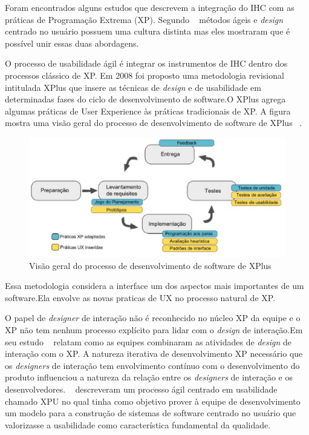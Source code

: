 Foram encontrados alguns estudos que descrevem a integração do IHC com as práticas de Programação Extrema (XP). Segundo ~ métodos ágeis e \emph{design} centrado no usuário possuem uma cultura distinta mas eles mostraram que é possível unir essas duas abordagens.

O processo de usabilidade ágil é integrar os instrumentos de IHC dentro dos processos clássico de XP. %
%
Em 2008 foi proposto uma metodologia revisional intitulada XPlus que insere as técnicas de \emph{design} e de usabilidade em determinadas fases do ciclo de desenvolvimento de software.O XPlus agrega algumas práticas de User Experience às práticas tradicionais de XP. A figura mostra uma visão geral do processo de desenvolvimento de software de XPlus ~\cite{guimaraesxplus}.

\begin{figure}[h]
    \centering
    \includegraphics[keepaspectratio=true,scale=0.60]
      {figuras/xplus.eps}
    \caption{Visão geral do processo de desenvolvimento de software de XPlus}
    \label{ciclo_xplus}
\end{figure}

Essa metodologia considera a interface um dos aspectos mais importantes de um software.Ela envolve as novas praticas de UX no processo natural de XP.

O papel de \emph{designer} de interação não é reconhecido no núcleo XP da equipe e o XP não tem nenhum processo explícito para lidar com o \emph{design} de interação.Em seu estudo ~ relatam como as equipes combinaram as atividades de \emph{design} de interação com o XP. 
%
A natureza iterativa de desenvolvimento XP necessário que os \emph{designers} de interação tem envolvimento contínuo com o desenvolvimento do produto influenciou a natureza da relação entre os \emph{designers} de interação e os desenvolvedores.
%
~ descreveram um processo ágil centrado em usabilidade chamado XPU no qual tinha como objetivo prover à equipe de desenvolvimento um modelo para a construção de sistemas de software centrado no usuário que valorizasse a usabilidade como característica fundamental da qualidade. 

